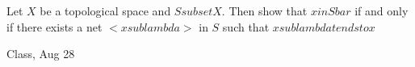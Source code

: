 \begin{samepage}
\begin{ex}
Let $X$ be a topological space and $S subset X$. Then show that $x in S bar$ if and only if there exists a net $< x sub lambda >$ in $S$ such that $ x sub lambda tends to x$
\end{ex}
\begin{source}
Class, Aug 28
\end{source}
\end{samepage}
